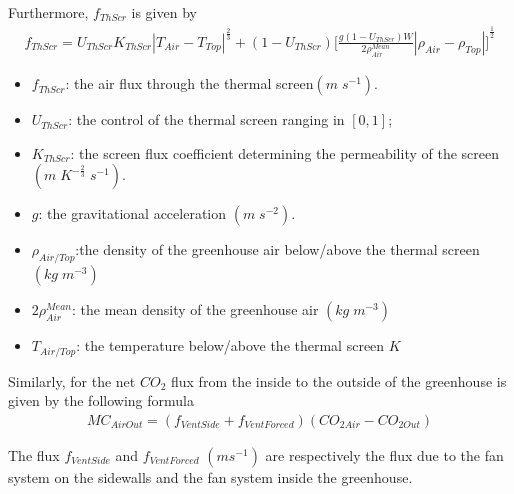 \documentclass[a4paper]{article}
\numberwithin{equation}{section}
\begin{document}
Furthermore, \(f_{ThScr}\) is given by
\begin{gather}
  f_{ThScr} = U_{ThScr} K_{ThScr} |T_{Air} - T_{Top}| ^{\frac{2}{3}} + (1 - U_{ThScr}) {\Bigg[\frac{g(1 - U_{ThScr})W}{2\rho^{Mean}_{Air}} |\rho_{Air} - \rho_{Top}|\Bigg]}^{\frac{1}{2}}
\end{gather}

\begin{itemize}
  \item  \(f_{ThScr}\): the air flux through the thermal screen\((m\;s^{-1})\). 
  \item \(U_{ThScr}\): the control of the thermal screen ranging in \([0,1]\);
  \item \(K_{ThScr}\): the screen flux coefficient determining the permeability of the screen \((m\;K^{-\frac{2}{3}}\;s^{-1})\).
  \item \(g \): the gravitational acceleration \((m\;s^{-2})\).
  \item \(\rho_{Air/Top} \):the density of the greenhouse air below/above the thermal screen \((kg\;m^{-3})\)
  \item \( {2\rho^{Mean}_{Air}}\): the mean density of the greenhouse air \((kg\;m^{-3})\)
  \item \(T_{Air/Top} \): the temperature below/above the thermal screen \(K\)
\end{itemize}

Similarly, for the net \(CO_2\) flux from the inside to the outside of the greenhouse is given by the following formula
\begin{gather}
  MC_{AirOut} = (f_{VentSide} + f_{VentForced})(CO_{2 Air} - CO_{2 Out})
\end{gather}

The flux \(f_{VentSide}\) and \(f_{VentForced}\) \((m s^{-1})\) are respectively the flux due to the fan system on the sidewalls and the fan system inside the greenhouse.

\end{document}
